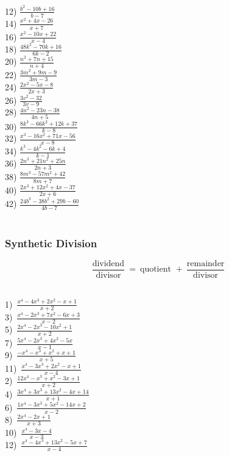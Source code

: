 \begin{multicols}{2}
  12) $\frac{b^2 - 10 b + 16}{b - 7}$\\
  14) $\frac{x^2 + 4 x - 26}{x + 7}$\\
  16) $\frac{x^2 - 10 x + 22}{x - 4}$\\
  18) $\frac{48 k^2 - 70 k + 16}{6 k - 2}$\\
  20) $\frac{n^2 + 7 n + 15}{n + 4}$\\
  22) $\frac{3 m^2 + 9 m - 9}{3 m - 3}$\\
  24) $\frac{2 x^2 - 5 x - 8}{2 x + 3}$\\
  26) $\frac{3 v^2 - 32}{3 v - 9}$\\
  28) $\frac{4 n^2 - 23 n - 38}{4 n + 5}$\\
  30) $\frac{8 k^3 - 66 k^2 + 12 k + 37}{k - 8}$\\
  32) $\frac{x^3 - 16 x^2 + 71 x - 56}{x - 8}$\\
  34) $\frac{k^3 - 4 k^2 - 6 k + 4}{k - 1}$\\
  36) $\frac{2 n^3 + 21 n^2 + 25 n}{2 n + 3}$\\
  38) $\frac{8 m^3 - 57 m^2 + 42}{8 m + 7}$\\
  40) $\frac{2 x^3 + 12 x^2 + 4 x - 37}{2 x + 6}$\\
  42) $\frac{24 b^3 - 38 b^2 + 29 b - 60}{4 b - 7}$\\
~\\
\end{multicols}

\newpage

\subsubsection{Synthetic Division}

{}
$$\frac{\text{dividend}}{\text{divisor}}~=~\text{quotient~}+~\frac{\text{remainder}}{\text{divisor}}$$
\\
\begin{multicols}{2}
  1)~$\frac{x^4-4x^3+2x^2-x+1 }{x+2}$\\
  3)~$\frac{x^4-2x^3+7x^2-6x+3 }{x-2}$\\
  5)~$\frac{2x^4-2x^3-10x^2+1 }{x+2}$\\
  7)~$\frac{5x^4-2x^3+4x^2-5x }{x-1}$\\
  9)~$\frac{-x^4-x^3+x^2+x+1 }{x+5}$\\
  11)~$\frac{x^4-3x^3+2x^2-x+1 }{x-4}$\\
  2)~$\frac{12x^4-x^3+x^2-3x+1 }{x+2}$\\
  4)~$\frac{3x^4+3x^3+13x^2-4x+14 }{x+1}$\\
  6)~$\frac{1x^4-3x^3+5x^2-14x+2 }{x-2}$\\
  8)~$\frac{2x^4-2x+1 }{x+3}$\\
  10)~$\frac{x^4-3x-4 }{x-3}$\\
  12)~$\frac{x^4-4x^3+13x^2-5x+7 }{x-4}$
\end{multicols}

